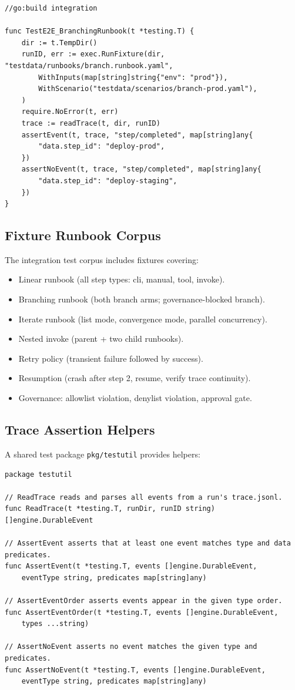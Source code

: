 \begin{verbatim}
//go:build integration

func TestE2E_BranchingRunbook(t *testing.T) {
    dir := t.TempDir()
    runID, err := exec.RunFixture(dir, "testdata/runbooks/branch.runbook.yaml",
        WithInputs(map[string]string{"env": "prod"}),
        WithScenario("testdata/scenarios/branch-prod.yaml"),
    )
    require.NoError(t, err)
    trace := readTrace(t, dir, runID)
    assertEvent(t, trace, "step/completed", map[string]any{
        "data.step_id": "deploy-prod",
    })
    assertNoEvent(t, trace, "step/completed", map[string]any{
        "data.step_id": "deploy-staging",
    })
}
\end{verbatim}

\subsection{Fixture Runbook Corpus}

The integration test corpus includes fixtures covering:

\begin{itemize}
  \item Linear runbook (all step types: cli, manual, tool, invoke).
  \item Branching runbook (both branch arms; governance-blocked branch).
  \item Iterate runbook (list mode, convergence mode, parallel concurrency).
  \item Nested invoke (parent + two child runbooks).
  \item Retry policy (transient failure followed by success).
  \item Resumption (crash after step 2, resume, verify trace continuity).
  \item Governance: allowlist violation, denylist violation, approval gate.
\end{itemize}

\subsection{Trace Assertion Helpers}

A shared test package \texttt{pkg/testutil} provides helpers:

\begin{verbatim}
package testutil

// ReadTrace reads and parses all events from a run's trace.jsonl.
func ReadTrace(t *testing.T, runDir, runID string) []engine.DurableEvent

// AssertEvent asserts that at least one event matches type and data predicates.
func AssertEvent(t *testing.T, events []engine.DurableEvent,
    eventType string, predicates map[string]any)

// AssertEventOrder asserts events appear in the given type order.
func AssertEventOrder(t *testing.T, events []engine.DurableEvent,
    types ...string)

// AssertNoEvent asserts no event matches the given type and predicates.
func AssertNoEvent(t *testing.T, events []engine.DurableEvent,
    eventType string, predicates map[string]any)
\end{verbatim}

